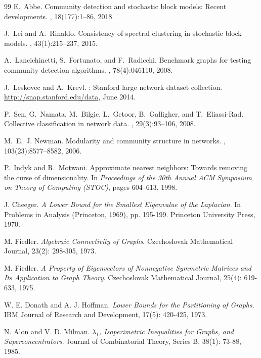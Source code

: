 \documentclass{article}
\theoremstyle{definition}
\theoremstyle{remark}
\begin{document}
\begin{thebibliography}{99}
E.~Abbe.
\newblock Community detection and stochastic block models: Recent developments.
, 18(177):1--86, 2018.

J.~Lei and A.~Rinaldo.
\newblock Consistency of spectral clustering in stochastic block models.
, 43(1):215--237, 2015.

A.~Lancichinetti, S.~Fortunato, and F.~Radicchi.
\newblock Benchmark graphs for testing community detection algorithms.
, 78(4):046110, 2008.

J.~Leskovec and A.~Krevl.
: {S}tanford large network dataset collection.
\newblock \url{http://snap.stanford.edu/data}, June 2014.

P.~Sen, G.~Namata, M.~Bilgic, L.~Getoor, B.~Galligher, and T.~Eliassi-Rad.
\newblock Collective classification in network data.
, 29(3):93--106, 2008.

M.~E.~J. Newman.
\newblock Modularity and community structure in networks.
,
  103(23):8577--8582, 2006.

P.~Indyk and R.~Motwani.
\newblock Approximate nearest neighbors: Towards removing the curse of
  dimensionality.
\newblock In {\em Proceedings of the 30th Annual ACM Symposium on Theory of
  Computing (STOC)}, pages 604--613, 1998.


J. Cheeger.
\textit{A Lower Bound for the Smallest Eigenvalue of the Laplacian}.
In Problems in Analysis (Princeton, 1969), pp. 195-199. Princeton University Press, 1970.

M. Fiedler.
\textit{Algebraic Connectivity of Graphs}.
Czechoslovak Mathematical Journal, 23(2): 298-305, 1973.

M. Fiedler.
\textit{A Property of Eigenvectors of Nonnegative Symmetric Matrices and Its Application to Graph Theory}.
Czechoslovak Mathematical Journal, 25(4): 619-633, 1975.

W. E. Donath and A. J. Hoffman.
\textit{Lower Bounds for the Partitioning of Graphs}.
IBM Journal of Research and Development, 17(5): 420-425, 1973.

N. Alon and V. D. Milman.
\textit{$\lambda_1$, Isoperimetric Inequalities for Graphs, and Superconcentrators}.
Journal of Combinatorial Theory, Series B, 38(1): 73-88, 1985.


\end{thebibliography}
\end{document}
